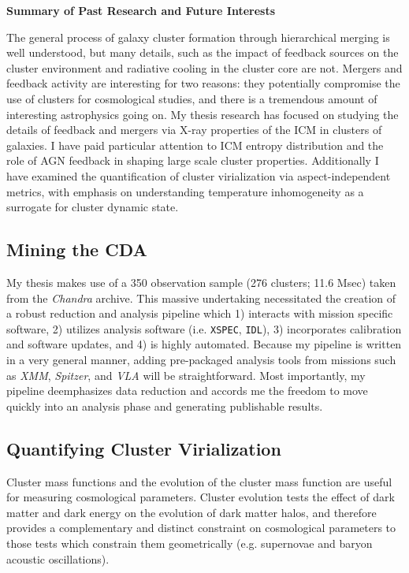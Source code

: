 \documentclass[11pt]{article}
\begin{document}
\begin{center}
\textbf{Summary of Past Research and Future Interests}\\
\end{center}

The general process of galaxy cluster formation through hierarchical
merging is well understood, but many details, such as the impact of
feedback sources on the cluster environment and radiative cooling in
the cluster core are not. Mergers and feedback activity are interesting for
two reasons: they potentially compromise the use of clusters for
cosmological studies, and there is a tremendous amount of interesting
astrophysics going on. My thesis research has focused on studying
the details of feedback and mergers via X-ray properties of the ICM in
clusters of galaxies. I have paid particular attention to ICM entropy
distribution and the role of AGN feedback in shaping large scale
cluster properties. Additionally I have examined the quantification
of cluster virialization via aspect-independent metrics, with emphasis
on understanding temperature inhomogeneity as a surrogate for cluster
dynamic state.

\subsection*{Mining the CDA}

My thesis makes use of a 350 observation sample (276 clusters; 11.6
Msec) taken from the {\it Chandra} archive. This massive
undertaking necessitated the creation of a robust reduction and
analysis pipeline which 1) interacts with mission specific software,
2) utilizes analysis software (i.e. {\tt{XSPEC}}, {\tt{IDL}}), 3)
incorporates calibration and software updates, and 4) is highly
automated. Because my pipeline is written in a very general manner,
adding pre-packaged analysis tools from missions such as
{\textit{XMM}}, {\textit{Spitzer}}, and {\textit{VLA}} will be
straightforward. Most importantly, my pipeline deemphasizes data
reduction and accords me the freedom to move quickly into an analysis
phase and generating publishable results.

\subsection*{Quantifying Cluster Virialization}

Cluster mass functions and the evolution of the cluster mass function
are useful for measuring cosmological parameters. Cluster evolution
tests the effect of dark matter and dark energy on the evolution of
dark matter halos, and therefore provides a complementary and distinct
constraint on cosmological parameters to those tests which constrain
them geometrically (e.g. supernovae and baryon acoustic
oscillations).
\end{document}

